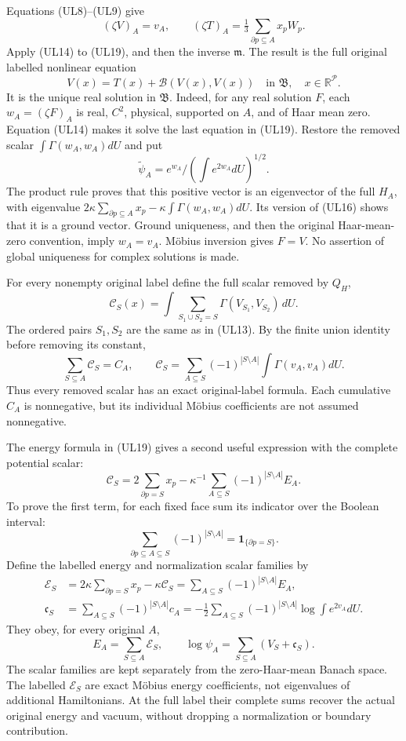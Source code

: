 \documentclass[11pt]{article}
\begin{document}
Equations (UL8)–(UL9) give
\[
 (\zeta V)_A=v_A,\qquad
 (\zeta T)_A=\tfrac13\sum_{\partial p\subseteq A}x_pW_p.
 \tag{UL23}
\]
Apply (UL14) to (UL19), and then the inverse \(\mathfrak m\). The result is the full original labelled nonlinear equation
\[
 \boxed{V(x)=T(x)+\mathcal B(V(x),V(x))}
 \quad\text{in }\mathfrak B,\quad x\in\mathbb R^{\mathcal P}.
 \tag{UL24}
\]
It is the unique real solution in \(\mathfrak B\). Indeed, for any real solution \(F\), each \(w_A=(\zeta F)_A\) is real, \(C^2\), physical, supported on \(A\), and of Haar mean zero. Equation (UL14) makes it solve the last equation in (UL19). Restore the removed scalar \(\int\Gamma(w_A,w_A)dU\) and put
\[
 \widetilde\psi_A=
       e^{w_A}\Big/\left(\int e^{2w_A}dU\right)^{1/2}.
\]
The product rule proves that this positive vector is an eigenvector of the full \(H_A\), with eigenvalue \(2\kappa\sum_{\partial p\subseteq A}x_p-\kappa\int\Gamma(w_A,w_A)dU\). Its version of (UL16) shows that it is a ground vector. Ground uniqueness, and then the original Haar-mean-zero convention, imply \(w_A=v_A\). Möbius inversion gives \(F=V\). No assertion of global uniqueness for complex solutions is made.

For every nonempty original label define the full scalar removed by \(Q_H\),
\[
 \mathcal C_S(x)
 =\int\sum_{S_1\cup S_2=S}
                 \Gamma(V_{S_1},V_{S_2})\,dU.
 \tag{UL25}
\]
The ordered pairs \(S_1,S_2\) are the same as in (UL13). By the finite union identity before removing its constant,
\[
 \sum_{S\subseteq A}\mathcal C_S=C_A,\qquad
 \boxed{\mathcal C_S
    =\sum_{A\subseteq S}(-1)^{|S\setminus A|}
                        \int\Gamma(v_A,v_A)dU.}
 \tag{UL26}
\]
Thus every removed scalar has an exact original-label formula. Each cumulative \(C_A\) is nonnegative, but its individual Möbius coefficients are not assumed nonnegative.

The energy formula in (UL19) gives a second useful expression with the complete potential scalar:
\[
 \boxed{\mathcal C_S
 =2\sum_{\partial p=S}x_p
     -\kappa^{-1}\sum_{A\subseteq S}(-1)^{|S\setminus A|}E_A.}
 \tag{UL27}
\]
To prove the first term, for each fixed face sum its indicator over the Boolean interval:
\[
 \sum_{\partial p\subseteq A\subseteq S}(-1)^{|S\setminus A|}
 =\mathbf1_{\{\partial p=S\}}.
 \tag{UL28}
\]
Define the labelled energy and normalization scalar families by
\[
\begin{aligned}
 \mathcal E_S&=2\kappa\sum_{\partial p=S}x_p-\kappa\mathcal C_S
          =\sum_{A\subseteq S}(-1)^{|S\setminus A|}E_A,\\
 \mathfrak c_S&=\sum_{A\subseteq S}(-1)^{|S\setminus A|}c_A
 =-\tfrac12\sum_{A\subseteq S}(-1)^{|S\setminus A|}
                      \log\int e^{2v_A}dU .
\end{aligned}\tag{UL29}
\]
They obey, for every original \(A\),
\[
 E_A=\sum_{S\subseteq A}\mathcal E_S,\qquad
 \log\psi_A=\sum_{S\subseteq A}(V_S+\mathfrak c_S).
 \tag{UL30}
\]
The scalar families are kept separately from the zero-Haar-mean Banach space. The labelled \(\mathcal E_S\) are exact Möbius energy coefficients, not eigenvalues of additional Hamiltonians. At the full label their complete sums recover the actual original energy and vacuum, without dropping a normalization or boundary contribution.
\end{document}
